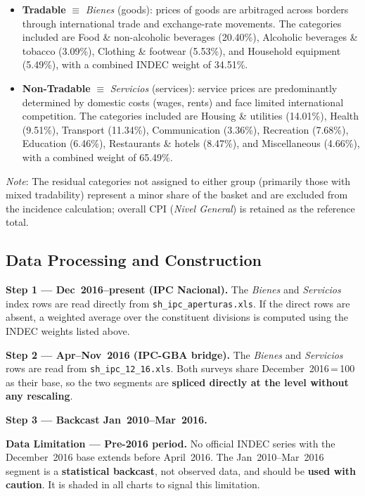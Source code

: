 \documentclass[11pt, a4paper]{article}
\begin{document}
\begin{itemize}[leftmargin=1.5em, itemsep=2pt]
    \item \textbf{Tradable} $\equiv$ \emph{Bienes} (goods): prices of goods
          are arbitraged across borders through international trade and
          exchange-rate movements. The categories included are Food \&
          non-alcoholic beverages (20.40\%), Alcoholic beverages \& tobacco
          (3.09\%), Clothing \& footwear (5.53\%), and Household equipment
          (5.49\%), with a combined INDEC weight of 34.51\%.

    \item \textbf{Non-Tradable} $\equiv$ \emph{Servicios} (services): service
          prices are predominantly determined by domestic costs (wages, rents)
          and face limited international competition. The categories included
          are Housing \& utilities (14.01\%), Health (9.51\%), Transport
          (11.34\%), Communication (3.36\%), Recreation (7.68\%), Education
          (6.46\%), Restaurants \& hotels (8.47\%), and Miscellaneous
          (4.66\%), with a combined weight of 65.49\%.
\end{itemize}

\textit{Note}: The residual categories not assigned to either group
(primarily those with mixed tradability) represent a minor share of the
basket and are excluded from the incidence calculation; overall CPI
(\emph{Nivel General}) is retained as the reference total.

\subsection{Data Processing and Construction}

\textbf{Step 1 — Dec~2016–present (IPC Nacional).}
The \emph{Bienes} and \emph{Servicios} index rows are read directly from
\texttt{sh\_ipc\_aperturas.xls}. If the direct rows are absent, a weighted
average over the constituent divisions is computed using the INDEC weights
listed above.

\textbf{Step 2 — Apr–Nov~2016 (IPC-GBA bridge).}
The \emph{Bienes} and \emph{Servicios} rows are read from
\texttt{sh\_ipc\_12\_16.xls}. Both surveys share December~2016\,=\,100 as
their base, so the two segments are \textbf{spliced directly at the level
without any rescaling}.

\textbf{Step 3 — Backcast Jan~2010–Mar~2016.}

\begin{center}
\colorbox{yellow!20}{%
\begin{minipage}{0.93\textwidth}
\small
\textbf{\color{red!70!black}Data Limitation — Pre-2016 period.}
No official INDEC series with the December~2016 base extends before
April~2016. The Jan~2010--Mar~2016 segment is a \textbf{statistical
backcast}, not observed data, and should be \textbf{used with caution}.
It is shaded in all charts to signal this limitation.
\end{minipage}}
\end{center}
\end{document}
